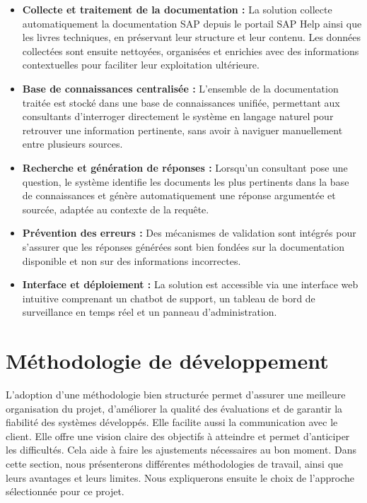 \begin{itemize}[leftmargin=*, label=\textbullet]

  \item \textbf{Collecte et traitement de la documentation :} La solution collecte automatiquement
la documentation SAP depuis le portail SAP Help ainsi que les livres techniques, en
préservant leur structure et leur contenu. Les données collectées sont ensuite nettoyées,
organisées et enrichies avec des informations contextuelles pour faciliter leur
exploitation ultérieure.

  \item \textbf{Base de connaissances centralisée :} L’ensemble de la documentation traitée est
stocké dans une base de connaissances unifiée, permettant aux consultants d’interroger
directement le système en langage naturel pour retrouver une information pertinente, sans
avoir à naviguer manuellement entre plusieurs sources.

  \item \textbf{Recherche et génération de réponses :} Lorsqu’un consultant pose une question,
le système identifie les documents les plus pertinents dans la base de connaissances et
génère automatiquement une réponse argumentée et sourcée, adaptée au contexte de la
requête.

  \item \textbf{Prévention des erreurs :} Des mécanismes de validation sont intégrés pour
s’assurer que les réponses générées sont bien fondées sur la documentation disponible
et non sur des informations incorrectes.

  \item \textbf{Interface et déploiement :} La solution est accessible via une interface web
intuitive comprenant un chatbot de support, un tableau de bord de surveillance en temps
réel et un panneau d’administration.

\end{itemize}

\section{Méthodologie de développement}
\label{sec:methodologie}
L’adoption d’une méthodologie bien structurée permet d’assurer une meilleure organisation du projet, d’améliorer la qualité des évaluations et de garantir la fiabilité des systèmes développés. Elle facilite aussi la communication avec le client. Elle offre une vision claire des objectifs à atteindre et permet d’anticiper les difficultés. Cela aide à faire les ajustements nécessaires au bon moment. Dans cette section, nous présenterons différentes méthodologies de travail, ainsi que leurs avantages et leurs limites. Nous expliquerons ensuite le choix de l’approche sélectionnée pour ce projet.

